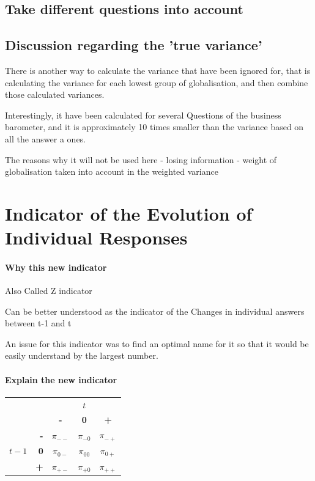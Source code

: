 \documentclass[12pt,a4paper,oneside]{book}
\begin{document}
\section{Take different questions into account}





\section{Discussion regarding the 'true variance'}

There is another way to calculate the variance that have been ignored for, that is calculating the variance for each lowest group of globalisation, and then combine those calculated variances.


Interestingly, it have been calculated for several Questions of the business barometer, and it is approximately 10 times smaller than the variance based on all the answer a ones.



The reasons why it will not be used here
- losing information
- weight of globalisation taken into account in the weighted variance




\chapter{Indicator of the Evolution of Individual Responses}

\subsubsection{Why this new indicator}

Also Called Z indicator

Can be better understood as the indicator of the Changes in individual answers between t-1 and t



 An issue for this indicator was to find an optimal name for it so that it would be easily understand by the largest number. \\

\subsubsection{Explain the new indicator}

\begin{center}
\begin{tabular}{r | r | c c c | }
\multicolumn{1}{r}{} & \multicolumn{1}{r}{} &	\multicolumn{3}{c}{$t$} \\ \cline{3-5}
\multicolumn{1}{r}{} & 		& \textbf{-} & \textbf{0} & \textbf{+} \\ \cline{2-5}
		&    \textbf{-} & $\pi_{--}$	& $\pi_{-0}$	& $\pi_{-+}$ \\ 
$t-1$ & \textbf{0} & $\pi_{0-}$	& $\pi_{00}$	& $\pi_{0+}$	\\
		&    \textbf{+} & $\pi_{+-}$	& $\pi_{+0}$	& $\pi_{++}$ \\ \cline{2-5}
\end{tabular}    
\end{center}
\end{document}
